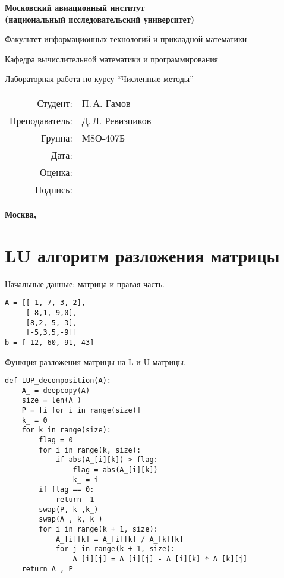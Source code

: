 \documentclass[pdf, unicode, 12pt, a4paper,oneside,fleqn]{article}
\begin{document}
\begin{titlepage}
\begin{center}
\bfseries
{\Large Московский авиационный институт\\ (национальный исследовательский университет)}

\vspace{48pt}
{\large Факультет информационных технологий и прикладной математики}

\vspace{36pt}
{\large Кафедра вычислительной математики и программирования}

\vspace{48pt}Лабораторная работа  по курсу 
\enquote{Численные методы}
\end{center}
\vspace{72pt}

\begin{flushright}
\begin{tabular}{rl}
Студент: & П.\,А. Гамов \\
Преподаватель: & Д.\,Л. Ревизников \\
Группа: & М8О-407Б \\
Дата: & \\
Оценка: & \\
Подпись: & \\
\end{tabular}
\end{flushright}
\vfill
\begin{center}
\bfseries
Москва, \the\year
\end{center}
\end{titlepage}

\pagebreak

\section{LU алгоритм разложения матрицы}

Начальные данные: матрица и правая часть.
\begin{lstlisting}
A = [[-1,-7,-3,-2],
     [-8,1,-9,0],
     [8,2,-5,-3],
     [-5,3,5,-9]]
b = [-12,-60,-91,-43]
\end{lstlisting}

Функция разложения матрицы на L и U матрицы.
\begin{lstlisting}
def LUP_decomposition(A):
    A_ = deepcopy(A)
    size = len(A_)
    P = [i for i in range(size)]
    k_ = 0
    for k in range(size):
        flag = 0
        for i in range(k, size):
            if abs(A_[i][k]) > flag:
                flag = abs(A_[i][k])
                k_ = i
        if flag == 0:
            return -1    
        swap(P, k ,k_)
        swap(A_, k, k_)
        for i in range(k + 1, size):
            A_[i][k] = A_[i][k] / A_[k][k]
            for j in range(k + 1, size):
                A_[i][j] = A_[i][j] - A_[i][k] * A_[k][j]
    return A_, P
\end{lstlisting}
\end{document}
